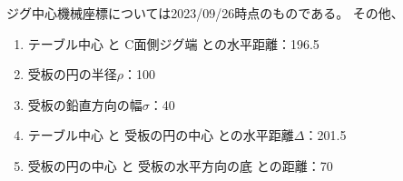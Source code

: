 \begin{hosoku}
ジグ中心機械座標については2023/09/26時点のものである。
その他、
\begin{enumerate}
\item テーブル中心 と C面側ジグ端 との水平距離：196.5
\item 受板の円の半径$\rho$：100
\item 受板の鉛直方向の幅$\sigma$：40
\item テーブル中心 と 受板の円の中心 との水平距離$\varDelta$：201.5
\item 受板の円の中心 と 受板の水平方向の底 との距離：70
\end{enumerate}
\end{hosoku}



